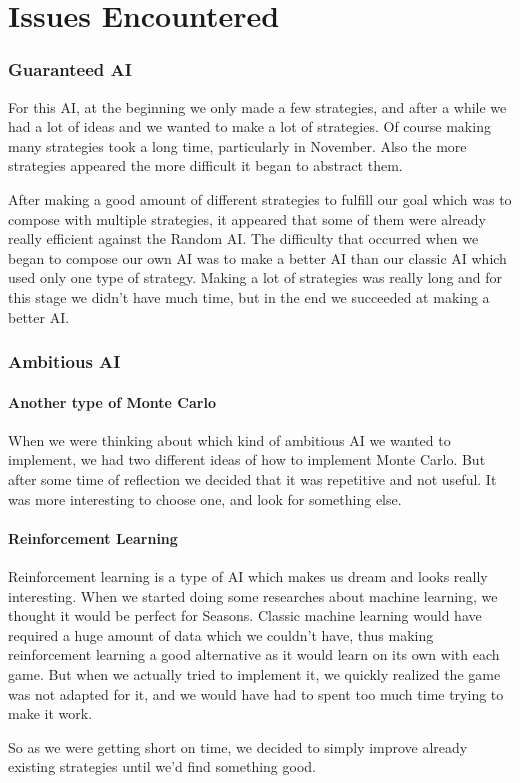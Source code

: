 \part{Issues Encountered}
    \section{Guaranteed AI}
        For this AI, at the beginning we only made a few strategies, and after a while we had a lot of ideas and we wanted to make a lot of strategies. 
        Of course making many strategies took a long time, particularly in November.
        Also the more strategies appeared the more difficult it began to abstract them.
        
        After making a good amount of different strategies to fulfill our goal which was to compose with multiple strategies, it appeared that some of them were already really efficient against the Random AI. The difficulty that occurred when we began to compose our own AI was to make a better AI than our classic AI which used only one type of strategy. Making a lot of strategies was really long and for this stage we didn't have much time, but in the end we succeeded at making a better AI.
    
    \section{Ambitious AI}
        \subsection{Another type of Monte Carlo}
            When we were thinking about which kind of ambitious AI we wanted to implement, we had two different ideas of how to implement Monte Carlo.
            But after some time of reflection we decided that it was repetitive and not useful. It was more interesting to choose one, and look for something else.

        \subsection{Reinforcement Learning}
            Reinforcement learning is a type of AI which makes us dream and looks really interesting.
            When we started doing some researches about machine learning, we thought it would be perfect for Seasons. Classic machine learning would have required a huge amount of data which we couldn't have, thus making reinforcement learning a good alternative as it would learn on its own with each game.
            But when we actually tried to implement it, we quickly realized the game was not adapted for it, and we would have had to spent too much time trying to make it work.
            
            So as we were getting short on time, we decided to simply improve already existing strategies until we'd find something good.
        
            
            
    